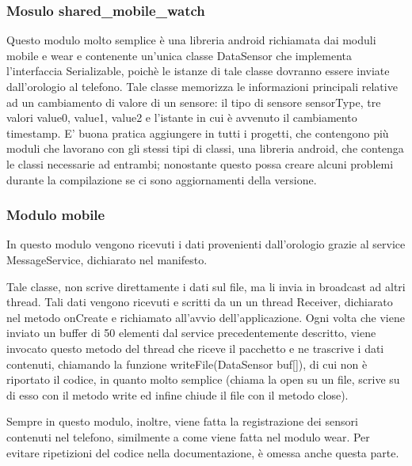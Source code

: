 \documentclass[a4paper]{article}
\begin{document}
\subsubsection{Mosulo shared\_mobile\_watch}
Questo modulo molto semplice è una libreria android richiamata dai moduli mobile e wear e contenente un’unica classe DataSensor che implementa l’interfaccia Serializable, poichè le istanze di tale classe dovranno essere inviate dall’orologio al telefono. 
Tale classe memorizza le informazioni principali relative ad un cambiamento di valore di un sensore:  il tipo di sensore sensorType, tre valori value0, value1, value2 e l’istante in cui è avvenuto il cambiamento timestamp.
E’ buona pratica aggiungere in tutti i progetti, che contengono più moduli che lavorano con gli stessi tipi di classi, una libreria android, che contenga le classi necessarie ad entrambi; nonostante questo possa creare alcuni problemi durante la compilazione se ci sono aggiornamenti della versione.
\makebox[\linewidth]{}



\subsubsection{Modulo mobile}
In questo modulo vengono ricevuti i dati provenienti dall’orologio grazie al service MessageService, dichiarato nel manifesto.\\
\makebox[\linewidth]{}

\makebox[\linewidth]{}
Tale classe, non scrive direttamente i dati sul file, ma li invia in broadcast ad altri thread. Tali dati vengono ricevuti e scritti da un un thread Receiver, dichiarato nel metodo onCreate e richiamato all’avvio dell’applicazione. Ogni volta che viene inviato un buffer di 50 elementi dal service precedentemente descritto, viene invocato questo metodo del thread che riceve il pacchetto e ne trascrive i dati contenuti, chiamando la funzione writeFile(DataSensor buf[]), di cui non è riportato il codice, in quanto molto semplice (chiama la open su un file, scrive su di esso con il metodo write ed infine chiude il file con il metodo close). 

\makebox[\linewidth]{}

\makebox[\linewidth]{}
Sempre in questo modulo, inoltre, viene fatta la registrazione dei sensori contenuti nel telefono, similmente a come viene fatta nel modulo wear. Per evitare ripetizioni del codice nella documentazione, è omessa anche questa parte.
\end{document}
